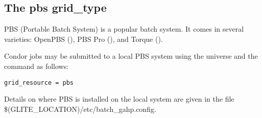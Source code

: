 
\subsection{\label{sec:PBS}The pbs grid\_type }

PBS (Portable Batch System) is a popular batch system. It comes in
several varieties: OpenPBS (),
PBS Pro (), and
Torque
().

Condor jobs may be submitted to a local PBS system
using the  universe and the
 command as follows:
\begin{verbatim}
grid_resource = pbs
\end{verbatim}

Details on where PBS is installed on the local system are
given in the file \$(GLITE\_LOCATION)/etc/batch\_gahp.config.
